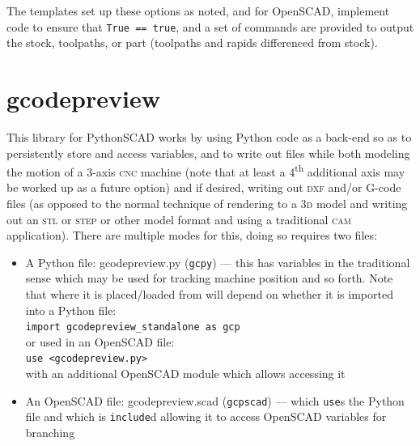 \documentclass{ltxdoc}
\begin{document}

\noindent The templates set up these options as noted, and for OpenSCAD, implement code to ensure that \verb|True == true|, and a set of commands are provided to output the stock, toolpaths, or part (toolpaths and rapids differenced from stock).

\section{gcodepreview}

This library for PythonSCAD works by using Python code as a back-end so as to persistently store and access variables, and to write out files while both modeling the motion of a 3-axis \textsc{cnc} machine (note that at least a 4\textsuperscript{th} additional axis may be worked up as a future option) and if desired, writing out \textsc{dxf} and/or G-code files (as opposed to the normal technique of rendering to a \textsc{3d} model and writing out an \textsc{stl} or \textsc{step} or other model format and using a traditional \textsc{cam} application). There are multiple modes for this, doing so requires two files:

\begin{itemize}
\item A Python file: gcodepreview.py (\texttt{gcpy}) --- this has
      variables in the traditional sense which may be used for tracking machine position and so
      forth. 
      Note that where it is placed/loaded from will depend on whether it is imported into
      a Python file:\\
      \verb|import gcodepreview_standalone as gcp|\\ 
      or used in an OpenSCAD file:\\
      \verb|use <gcodepreview.py>|\\
      with an additional OpenSCAD module which allows accessing it
\item An OpenSCAD file: gcodepreview.scad (\texttt{gcpscad}) --- which \verb|use|s the Python file 
      and which is \texttt{include}d allowing it to access OpenSCAD variables for branching   
\end{itemize}
\end{document}
